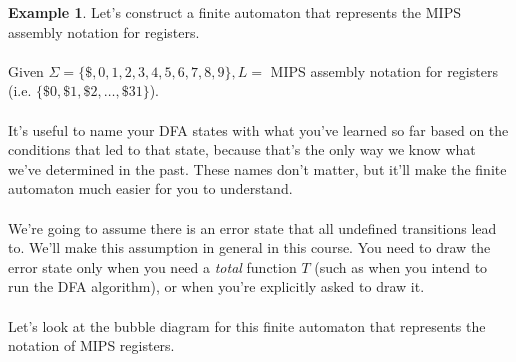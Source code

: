 \documentclass[]{article}
\theoremstyle{definition}
\newtheorem{ex}{Example}[section]
\begin{document}
			\begin{ex}
				Let's construct a finite automaton that represents the MIPS assembly notation for registers.
				\\ \\
				Given $\Sigma = \{ \$, 0, 1, 2, 3, 4, 5, 6, 7, 8, 9 \}, L = $ MIPS assembly notation for registers (i.e. $\{ \$0, \$1, \$2, \ldots, \$31 \}$).
				\\ \\
				It's useful to name your DFA states with what you've learned so far based on the conditions that led to that state, because that's the only way we know what we've determined in the past. These names don't matter, but it'll make the finite automaton much easier for you to understand.
				\\ \\
				We're going to assume there is an error state that all undefined transitions lead to. We'll make this assumption in general in this course. You need to draw the error state only when you need a \emph{total} function $T$ (such as when you intend to run the DFA algorithm), or when you're explicitly asked to draw it.
				\\ \\
				Let's look at the bubble diagram for this finite automaton that represents the notation of MIPS registers.
				\begin{center}
\end{center}
\end{ex}
\end{document}
